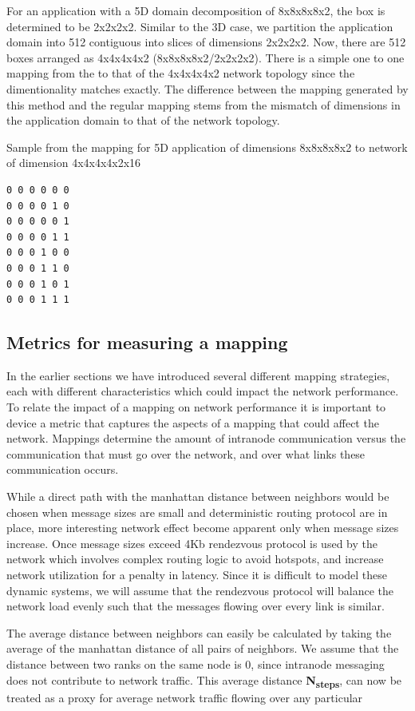 \documentclass{acm_proc_article-sp}
\begin{document}
For an application with a 5D domain decomposition of 8x8x8x8x2, the box is determined to be 2x2x2x2. Similar to the 3D case, we
partition the application domain into 512 contiguous into  slices of dimensions 2x2x2x2.
Now, there are 512 boxes arranged as 4x4x4x4x2 (8x8x8x8x2/2x2x2x2). There is a simple one to one mapping from the
to that of the 4x4x4x4x2 network topology since the dimentionality matches exactly. The difference between the mapping
generated by this method and the regular mapping stems from the mismatch of dimensions in the application domain to that
of the network topology.

Sample from the mapping for 5D application of dimensions 8x8x8x8x2 to network of dimension 4x4x4x4x2x16
\begin{lstlisting}[frame=lines, basicstyle=\ttfamily,columns=fixed]
0 0 0 0 0 0
0 0 0 0 1 0
0 0 0 0 0 1
0 0 0 0 1 1
0 0 0 1 0 0
0 0 0 1 1 0
0 0 0 1 0 1
0 0 0 1 1 1
\end{lstlisting}

\subsection{Metrics for measuring a mapping}

In the earlier sections we have introduced several different mapping strategies, each with different characteristics which could
impact the network performance. To relate the impact of a mapping on network performance it is important to device a metric that
captures the aspects of a mapping that could affect the network. Mappings determine the amount of intranode communication versus
the communication that must go over the network, and over what links these communication occurs.

While a direct path with the manhattan distance between neighbors would be chosen when message sizes are small and deterministic routing
protocol are in place, more interesting network effect become apparent only when message sizes increase. Once message sizes exceed 4Kb
rendezvous protocol is used by the network which involves complex routing logic to avoid hotspots, and increase network utilization for
a penalty in latency. Since it is difficult to model these dynamic systems, we will assume that the rendezvous protocol will balance
the network load evenly such that the messages flowing over every link is similar.


The average distance between neighbors can easily be calculated by taking the average of the manhattan distance of all pairs of neighbors.
We assume that the distance between two ranks on the same node is 0, since intranode messaging does not contribute to network traffic.
This average distance \textbf{N\textsubscript{steps}}, can now be treated as a proxy for average network traffic flowing over any particular 
\end{document}
